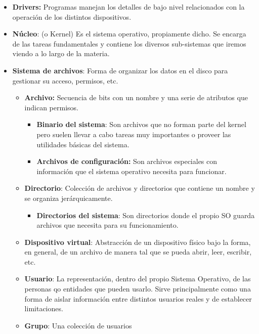 \begin{itemize}
	\item \textbf{Drivers:} Programas manejan los detalles de bajo nivel relacionados con la operación de los distintos dispositivos.
	\item \textbf{Núcleo}: (o Kernel) Es el sistema operativo, propiamente dicho. Se encarga de las tareas fundamentales y contiene los diversos sub-sistemas que iremos viendo a lo largo de la materia.
	\item\textbf{Sistema de archivos}: Forma de organizar los datos en el disco para gestionar su acceso, permisos, etc.
	\begin{itemize}
			\item \textbf{Archivo:} Secuencia de bits con un nombre y una serie de atributos que indican permisos.
			\begin{itemize}
				\item\textbf{Binario del sistema}: Son archivos que no forman parte del kernel pero suelen llevar a cabo tareas muy importantes o proveer las utilidades básicas del sistema.
				\item \textbf{Archivos de configuración:} Son archivos especiales con información que el sistema operativo necesita para funcionar.
			\end{itemize}

		\item \textbf{Directorio}: Colección de archivos y directorios que contiene un nombre y se organiza jerárquicamente.
		\begin{itemize}
			\item\textbf{Directorios del sistema}: Son directorios donde el propio SO guarda archivos que necesita para su funcionamiento.
		\end{itemize}
		\item \textbf{Dispositivo virtual}: Abstracción de un dispositivo físico bajo la forma, en general, de un archivo de manera tal que se pueda abrir, leer, escribir, etc.

		\item \textbf{Usuario}: La representación, dentro del propio Sistema Operativo, de las personas qo entidades que pueden usarlo. Sirve principalmente como una forma de aislar información entre distintos usuarios reales y de establecer limitaciones.

		\item \textbf{Grupo}: Una colección de usuarios
	\end{itemize}
\end{itemize}

